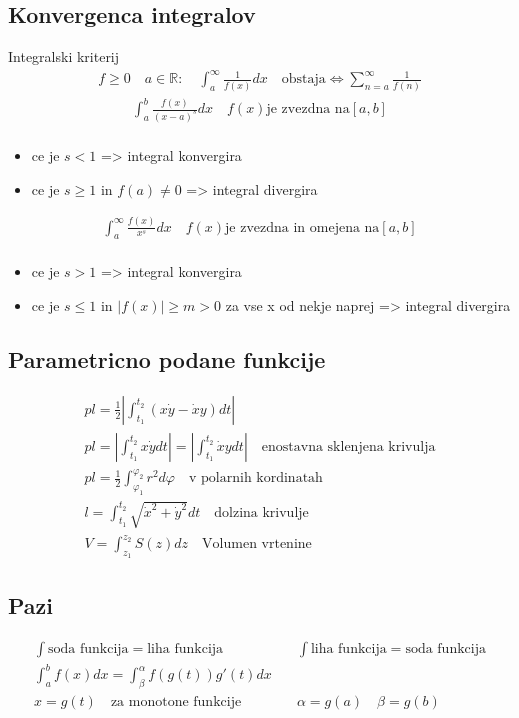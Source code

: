 \documentclass[a4paper,oneside,8pt]{extarticle}
\theoremstyle{definition}
\newcommand{\R}{\ensuremath{\mathbb{R}}}
\renewcommand{\phi}{\varphi}
\newcommand\abs[1]{\left|#1\right|}
\begin{document}
\begin{multicols}{2}
	\subsection*{Konvergenca integralov}
		Integralski kriterij\\
		\begin{align*}
			f \ge 0 \quad a \in \R: \quad \int_{a}^{\infty} \frac{1}{f(x)}dx \quad \text{obstaja} \Longleftrightarrow \sum_{n = a}^{\infty} \frac{1}{f(n)}
		\end{align*}		
		\begin{align*}
			\int_{a}^{b} \frac{f(x)}{(x-a)^s}dx \quad f(x) \text{je zvezdna na} [a,b]\\
		\end{align*}
		\begin{itemize}
			\item ce je $s < 1$ => integral konvergira
			\item ce je $s \geq 1$ in $f(a) \neq 0$ => integral divergira
		\end{itemize}
		\begin{align*}
			\int_{a}^{\infty} \frac{f(x)}{x^s}dx \quad f(x) \text{je zvezdna in omejena na} [a,b]\\
		\end{align*}
		\begin{itemize}
			\item ce je $s > 1$ => integral konvergira
			\item ce je $s \leq 1$ in $\abs{f(x)} \geq m > 0$ za vse x od nekje naprej => integral divergira
		\end{itemize}
%
	\subsection*{Parametricno podane funkcije}
		\begin{align*}
			pl = \frac{1}{2} \abs{\int_{t_1}^{t_2}(x\dot{y} - \dot{x}y)dt}\\
			pl = \abs{\int_{t_1}^{t_2}x\dot{y}dt} = \abs{\int_{t_1}^{t_2}\dot{x}ydt} \quad \text{enostavna sklenjena krivulja}\\
			pl = \frac{1}{2} \int_{\phi_1}^{\phi_2} r^2 d\phi \quad \text{v polarnih kordinatah}\\
			l = \int_{t_1}^{t_2} \sqrt{\dot{x}^2 + \dot{y}^2}dt \quad \text{dolzina krivulje}\\
			V = \int_{z_1}^{z_2} S(z)dz \quad \text{Volumen vrtenine}
		\end{align*}
%
	\subsection*{Pazi}
	\begin{align*}
		\int \text{soda funkcija} = \text{liha funkcija} &\quad \int \text{liha funkcija} = \text{soda funkcija}\\
		\int_{a}^{b} f(x)dx = \int_{\beta}^{\alpha} f(g(t))g'(t)dx\\
		x = g(t) \quad \text{za monotone funkcije} &\quad \alpha = g(a) \quad \beta = g(b)
	\end{align*}
%

\end{multicols}
\end{document}
